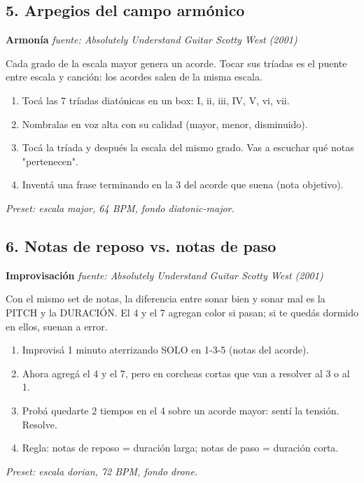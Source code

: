 \documentclass[11pt,a4paper]{article}
\begin{document}
\subsection{5. Arpegios del campo armónico}
\textbf{Armonía} \hfill \emph{fuente: Absolutely Understand Guitar \textemdash{} Scotty West (2001)}
\par Cada grado de la escala mayor genera un acorde. Tocar sus tríadas es el puente entre escala y canción: los acordes salen de la misma escala.
\begin{enumerate}
\item Tocá las 7 tríadas diatónicas en un box: I, ii, iii, IV, V, vi, vii\textdegree{}.
\item Nombralas en voz alta con su calidad (mayor, menor, disminuido).
\item Tocá la tríada y después la escala del mismo grado. Vas a escuchar qué notas "pertenecen".
\item Inventá una frase terminando en la 3\textordfeminine{} del acorde que suena (nota objetivo).
\end{enumerate}
\emph{Preset: escala major, 64 BPM, fondo diatonic-major.}
\subsection{6. Notas de reposo vs. notas de paso}
\textbf{Improvisación} \hfill \emph{fuente: Absolutely Understand Guitar \textemdash{} Scotty West (2001)}
\par Con el mismo set de notas, la diferencia entre sonar bien y sonar mal es la PITCH y la DURACIÓN. El 4\textordmasculine{} y el 7\textordmasculine{} agregan color si pasan; si te quedás dormido en ellos, suenan a error.
\begin{enumerate}
\item Improvisá 1 minuto aterrizando SOLO en 1-3-5 (notas del acorde).
\item Ahora agregá el 4 y el 7, pero en corcheas cortas que van a resolver al 3 o al 1.
\item Probá quedarte 2 tiempos en el 4 sobre un acorde mayor: sentí la tensión. Resolve.
\item Regla: notas de reposo = duración larga; notas de paso = duración corta.
\end{enumerate}
\emph{Preset: escala dorian, 72 BPM, fondo drone.}
\end{document}
